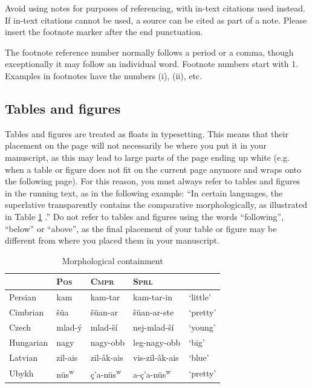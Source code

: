 \documentclass[charis,linguex]{glossa}
\begin{document}
Avoid using notes for purposes of referencing, with in-text citations used instead. If in-text citations cannot be used, a source can be cited as part of a note. Please insert the footnote marker after the end punctuation.

The footnote reference number normally follows a period or a comma, though exceptionally it may follow an individual word. Footnote numbers start with 1. Examples in footnotes have the numbers (i), (ii), etc.

\subsection{Tables and figures}

Tables and figures are treated as floats in typesetting. This means that their placement on the page will not necessarily be where you put it in your manuscript, as this may lead to large parts of the page ending up white (e.g. when a table or figure does not fit on the current page anymore and wraps onto the following page). For this reason, you must always refer to tables and figures in the running text, as in the following example: ``In certain languages, the superlative transparently contains the comparative morphologically, as illustrated in Table \ref{tbl:table1} \citep[46]{Bobaljik2012}.'' Do not refer to tables and figures using the words ``following'', ``below'' or ``above'', as the final placement of your table or figure may be different from where you placed them in your manuscript.

\begin{table}[h]
\sffamily
\centering
\caption{Morphological containment}	
\begin{tabular}{lllll}
 & \textsc{Pos} & \textsc{Cmpr} & \textsc{Sprl}\\
\hline 
Persian & kam & kam-tar & kam-tar-in & ‘little’\\
Cimbrian & šüa & šüan-ar & šüan-ar-ste & ‘pretty’ \\
Czech & mlad-ý & mlad-ší & nej-mlad-ší & ‘young’\\
Hungarian & nagy & nagy-obb & leg-nagy-obb & ‘big’\\
Latvian & zil-ais & zil-âk-ais & vis-zil-âk-ais & ‘blue’\\
Ubykh &  nüs\textsuperscript{w}\textipa{@} & ç’a-nüs\textsuperscript{w}\textipa{@} & a-ç’a-nüs\textsuperscript{w}\textipa{@} & ‘pretty’ \\
\end{tabular}\label{tbl:table1}
\end{table}
\end{document}
